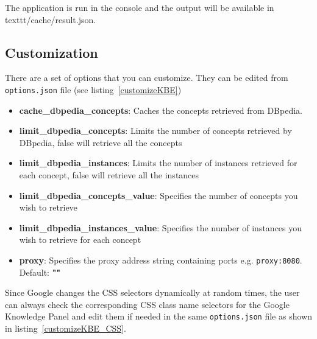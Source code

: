 The application is run in the console and the output will be available in texttt{/cache/result.json}.

\subsection{Customization}

There are a set of options that you can customize. They can be edited from \texttt{options.json} file (see listing~\ref{customizeKBE})



\begin{itemize}
	\item \textbf{cache\_dbpedia\_concepts}: Caches the concepts retrieved from
	  DBpedia.
	\item \textbf{limit\_dbpedia\_concepts}: Limits the number of concepts
	  retrieved by DBpedia, false will retrieve all the concepts
	\item \textbf{limit\_dbpedia\_instances}: Limits the number of instances
	  retrieved for each concept, false will retrieve all the instances
	\item \textbf{limit\_dbpedia\_concepts\_value}: Specifies the number of concepts you
	  wish to retrieve
	\item \textbf{limit\_dbpedia\_instances\_value}: Specifies the number of instances you wish to retrieve for each concept
	\item \textbf{proxy}: Specifies the proxy address string containing ports e.g. \texttt{proxy:8080}. Default: \textbf{""}
\end{itemize}

Since Google changes the CSS selectors dynamically at random times, the user can always check the corresponding CSS class name selectors for the Google Knowledge Panel and edit them if needed in the same \texttt{options.json} file as shown in listing~\ref{customizeKBE_CSS}.

